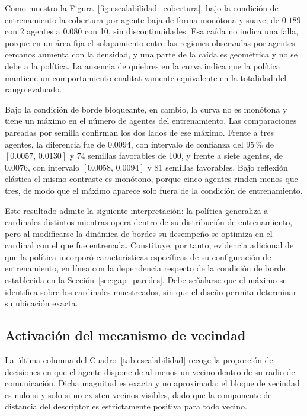 Como muestra la Figura~\ref{fig:escalabilidad_cobertura}, bajo la condición de entrenamiento la cobertura por agente baja de forma monótona y suave, de $0{.}189$ con 2 agentes a $0{.}080$ con 10, sin discontinuidades. Esa caída no indica una falla, porque en un área fija el solapamiento entre las regiones observadas por agentes cercanos aumenta con la densidad, y una parte de la caída es geométrica y no se debe a la política. La ausencia de quiebres en la curva
indica que la política mantiene un comportamiento cualitativamente equivalente
en la totalidad del rango evaluado.

Bajo la condición de borde bloqueante, en cambio, la curva no es monótona y tiene un máximo en el número de agentes del entrenamiento. Las comparaciones pareadas por semilla confirman los dos lados de ese máximo. Frente a tres agentes, la diferencia fue de $0{.}0094$, con intervalo de confianza del $95$\,\% de $[0{.}0057,\, 0{.}0130]$ y 74 semillas favorables de 100, y frente a siete agentes, de $0{.}0076$, con intervalo $[0{.}0058,\, 0{.}0094]$ y 81 semillas favorables. Bajo reflexión elástica el mismo contraste es monótono, porque cinco agentes rinden menos que tres, de modo que el máximo aparece solo fuera de la condición de entrenamiento.

Este resultado admite la siguiente interpretación: la política generaliza a
cardinales distintos mientras opera dentro de su distribución de
entrenamiento, pero al modificarse la dinámica de bordes su desempeño se
optimiza en el cardinal con el que fue entrenada. Constituye, por tanto,
evidencia adicional de que la política incorporó características específicas
de su configuración de entrenamiento, en línea con la dependencia respecto de
la condición de borde establecida en la Sección~\ref{sec:gap_paredes}. Debe
señalarse que el máximo se identifica sobre los cardinales muestreados, sin que
el diseño permita determinar su ubicación exacta.

\subsection*{Activación del mecanismo de vecindad}

La última columna del Cuadro~\ref{tab:escalabilidad} recoge la proporción de
decisiones en que el agente dispone de al menos un vecino dentro de su radio de
comunicación. Dicha magnitud es exacta y no aproximada: el bloque de vecindad
es nulo si y solo si no existen vecinos visibles, dado que la componente de
distancia del descriptor es estrictamente positiva para todo vecino.

